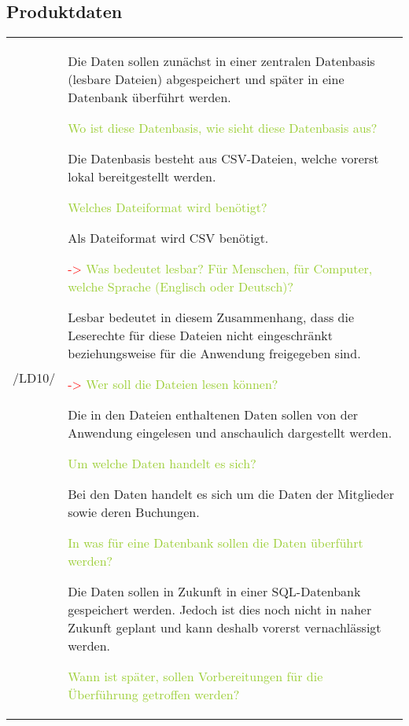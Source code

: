 \subsection{Produktdaten}

\begin{center}
    \begin{tabular}[ht] {l | p{13cm}}
        \hline
        /LD10/ & Die Daten sollen zunächst in einer zentralen Datenbasis (lesbare Dateien) abgespeichert und später in eine Datenbank überführt werden. 
        
        \textcolor{YellowGreen}{Wo ist diese Datenbasis, wie sieht diese Datenbasis aus?}
        
        \textcolor{NavyBlue}{Die Datenbasis besteht aus CSV-Dateien, welche vorerst lokal bereitgestellt werden.}


        \textcolor{YellowGreen}{Welches Dateiformat wird benötigt?}

        \textcolor{NavyBlue}{Als Dateiformat wird CSV benötigt.}

        \textcolor{Red}{->}
        \textcolor{YellowGreen}{Was bedeutet lesbar? Für Menschen, für Computer, welche Sprache (Englisch oder Deutsch)?}

        \textcolor{NavyBlue}{Lesbar bedeutet in diesem Zusammenhang, dass die Leserechte für diese Dateien nicht eingeschränkt beziehungsweise für die Anwendung freigegeben sind.}

        \textcolor{Red}{->}
        \textcolor{YellowGreen}{Wer soll die Dateien lesen können?}
        
        \textcolor{NavyBlue}{Die in den Dateien enthaltenen Daten sollen von der Anwendung eingelesen und anschaulich dargestellt werden.}


        \textcolor{YellowGreen}{Um welche Daten handelt es sich?}

        \textcolor{NavyBlue}{Bei den Daten handelt es sich um die Daten der Mitglieder sowie deren Buchungen.}


        \textcolor{YellowGreen}{In was für eine Datenbank sollen die Daten überführt werden?}

        \textcolor{NavyBlue}{Die Daten sollen in Zukunft in einer SQL-Datenbank gespeichert werden. Jedoch ist dies noch nicht in naher Zukunft geplant und kann deshalb vorerst vernachlässigt werden.}

        \textcolor{YellowGreen}{Wann ist später, sollen Vorbereitungen für die Überführung getroffen werden?}


\end{tabular}
\end{center}
